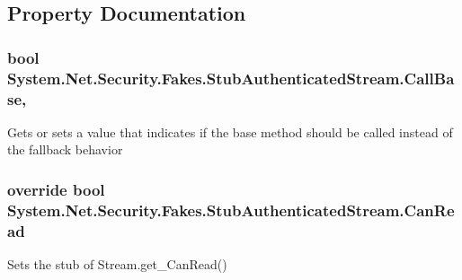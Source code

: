 \subsection{Property Documentation}
\hypertarget{class_system_1_1_net_1_1_security_1_1_fakes_1_1_stub_authenticated_stream_a21586a3efea86e8c922fcb2e94c8fad2}{
\subsubsection[{Call\-Base}]{\setlength{\rightskip}{0pt plus 5cm}bool System.\-Net.\-Security.\-Fakes.\-Stub\-Authenticated\-Stream.\-Call\-Base\hspace{0.3cm}{\ttfamily [get]}, {\ttfamily [set]}}}\label{class_system_1_1_net_1_1_security_1_1_fakes_1_1_stub_authenticated_stream_a21586a3efea86e8c922fcb2e94c8fad2}


Gets or sets a value that indicates if the base method should be called instead of the fallback behavior

\hypertarget{class_system_1_1_net_1_1_security_1_1_fakes_1_1_stub_authenticated_stream_a21d5ea90b29a895479bd59aff21a911f}{
\subsubsection[{Can\-Read}]{\setlength{\rightskip}{0pt plus 5cm}override bool System.\-Net.\-Security.\-Fakes.\-Stub\-Authenticated\-Stream.\-Can\-Read\hspace{0.3cm}{\ttfamily [get]}}}\label{class_system_1_1_net_1_1_security_1_1_fakes_1_1_stub_authenticated_stream_a21d5ea90b29a895479bd59aff21a911f}


Sets the stub of Stream.\-get\-\_\-\-Can\-Read()


